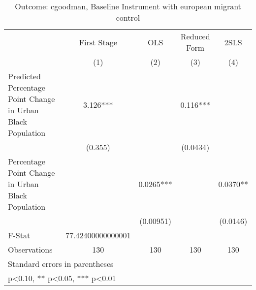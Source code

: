 \begin{table}[htbp]\centering
\def\sym#1{\ifmmode^{#1}\else\(^{#1}\)\fi}
\caption{Outcome: cgoodman, Baseline Instrument with european migrant control}
\begin{tabular}{l*{4}{c}}
\toprule
                    & First Stage   &         OLS   &Reduced Form   &        2SLS   \\
                    &\multicolumn{1}{c}{(1)}   &\multicolumn{1}{c}{(2)}   &\multicolumn{1}{c}{(3)}   &\multicolumn{1}{c}{(4)}   \\
\midrule
Predicted Percentage Point Change in Urban Black Population&       3.126***&               &       0.116***&               \\
                    &     (0.355)   &               &    (0.0434)   &               \\
\addlinespace
Percentage Point Change in Urban Black Population&               &      0.0265***&               &      0.0370** \\
                    &               &   (0.00951)   &               &    (0.0146)   \\
\midrule
F-Stat              &77.42400000000001   &               &               &               \\
Observations        &         130   &         130   &         130   &         130   \\
\bottomrule
\multicolumn{5}{l}{\footnotesize Standard errors in parentheses}\\
\multicolumn{5}{l}{\footnotesize * p<0.10, ** p<0.05, *** p<0.01}\\
\end{tabular}
\end{table}
